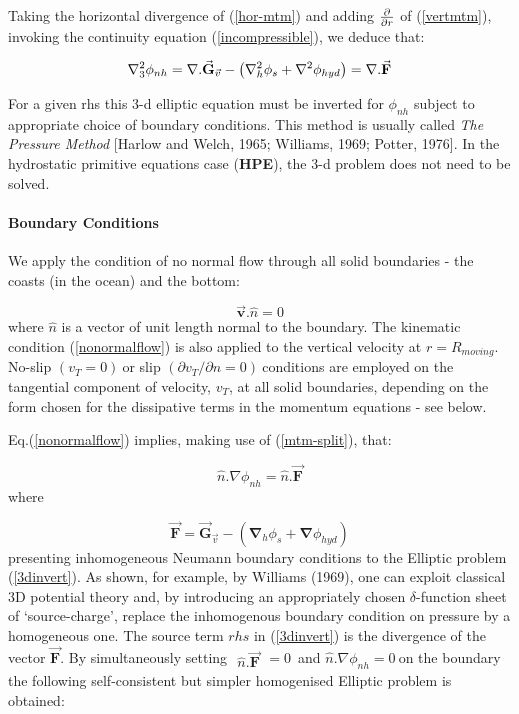 Taking the horizontal divergence of (\ref{hor-mtm}) and adding $\frac{%
\partial }{\partial r}$ of (\ref{vertmtm}), invoking the continuity equation
(\ref{incompressible}), we deduce that:

\begin{equation}
\nabla _{3}^{2}\phi _{nh}=\nabla .\vec{\mathbf{G}}_{\vec{v}}-\left( \mathbf{%
\nabla }_{h}^{2}\phi _{s}+\mathbf{\nabla }^{2}\phi _{hyd}\right) =\nabla .%
\vec{\mathbf{F}}  \label{eq:3d-invert}
\end{equation}

For a given rhs this 3-d elliptic equation must be inverted for $\phi _{nh}$
subject to appropriate choice of boundary conditions. This method is usually
called \textit{The Pressure Method} [Harlow and Welch, 1965; Williams, 1969;
Potter, 1976]. In the hydrostatic primitive equations case (\textbf{HPE}),
the 3-d problem does not need to be solved.

\paragraph{Boundary Conditions}

We apply the condition of no normal flow through all solid boundaries - the
coasts (in the ocean) and the bottom:

\begin{equation}
\vec{\mathbf{v}}.\widehat{n}=0  \label{nonormalflow}
\end{equation}
where $\widehat{n}$ is a vector of unit length normal to the boundary. The
kinematic condition (\ref{nonormalflow}) is also applied to the vertical
velocity at $r=R_{moving}$. No-slip $\left( v_{T}=0\right) \ $or slip $%
\left( \partial v_{T}/\partial n=0\right) \ $conditions are employed on the
tangential component of velocity, $v_{T}$, at all solid boundaries,
depending on the form chosen for the dissipative terms in the momentum
equations - see below.

Eq.(\ref{nonormalflow}) implies, making use of (\ref{mtm-split}), that:

\begin{equation}
\widehat{n}.\nabla \phi _{nh}=\widehat{n}.\vec{\mathbf{F}}
\label{eq:inhom-neumann-nh}
\end{equation}
where

\[
\vec{\mathbf{F}}=\vec{\mathbf{G}}_{\vec{v}}-\left( \mathbf{\nabla }_{h}\phi
_{s}+\mathbf{\nabla }\phi _{hyd}\right) 
\]
presenting inhomogeneous Neumann boundary conditions to the Elliptic problem
(\ref{3dinvert}). As shown, for example, by Williams (1969), one can exploit
classical 3D potential theory and, by introducing an appropriately chosen $%
\delta $-function sheet of `source-charge', replace the inhomogenous
boundary condition on pressure by a homogeneous one. The source term $rhs$
in (\ref{3dinvert}) is the divergence of the vector $\vec{\mathbf{F}}.$ By
simultaneously setting $
\begin{array}{l}
\widehat{n}.\vec{\mathbf{F}}
\end{array}
=0$\ and $\widehat{n}.\nabla \phi _{nh}=0\ $on the boundary the following
self-consistent but simpler homogenised Elliptic problem is obtained:

